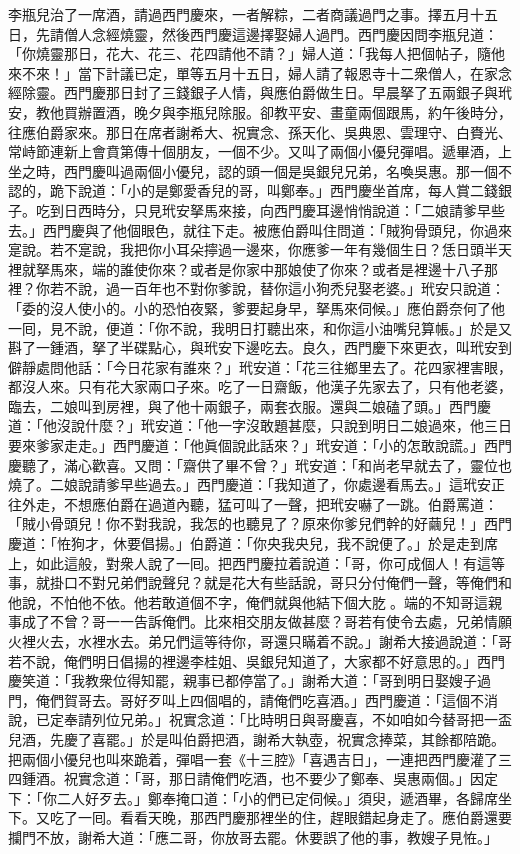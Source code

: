 李瓶兒治了一席酒，請過西門慶來，一者解粽，二者商議過門之事。擇五月十五日，先請僧人念經燒靈，然後西門慶這邊擇娶婦人過門。西門慶因問李瓶兒道：「你燒靈那日，花大、花三、花四請他不請？」{}婦人道：「我每人把個帖子，隨他來不來！」當下計議已定，單等五月十五日，婦人請了報恩寺十二衆僧人，在家念經除靈。西門慶那日封了三錢銀子人情，與應伯爵做生日。早晨拏了五兩銀子與玳安，教他買辦置酒，晚夕與李瓶兒除服。卻教平安、畫童兩個跟馬，約午後時分，往應伯爵家來。那日在席者謝希大、祝實念、孫天化、吳典恩、雲理守、白賚光、常峙節連新上會賁第傳十個朋友，一個不少。{}又叫了兩個小優兒彈唱。遞畢酒，上坐之時，西門慶叫過兩個小優兒，認的頭一個是吳銀兒兄弟，名喚吳惠。那一個不認的，{}跪下說道：「小的是鄭愛香兒的哥，叫鄭奉。」西門慶坐首席，每人賞二錢銀子。吃到日西時分，只見玳安拏馬來接，向西門慶耳邊悄悄說道：「二娘請爹早些去。」西門慶與了他個眼色，就往下走。{}被應伯爵叫住問道：「賊狗骨頭兒，你過來寔說。若不寔說，我把你小耳朵擰過一邊來，你應爹一年有幾個生日？恁日頭半天裡就拏馬來，端的誰使你來？或者是你家中那娘使了你來？或者是裡邊十八子那裡？你若不說，過一百年也不對你爹說，替你這小狗禿兒娶老婆。」玳安只說道：「委的沒人使小的。小的恐怕夜緊，爹要起身早，拏馬來伺候。」應伯爵奈何了他一囘，見不說，便道：「你不說，我明日打聽出來，和你這小油嘴兒算帳。」於是又斟了一鍾酒，拏了半碟點心，與玳安下邊吃去。良久，西門慶下來更衣，叫玳安到僻靜處問他話：「今日花家有誰來？」{}玳安道：「花三往鄉里去了。花四家裡害眼，都沒人來。只有花大家兩口子來。吃了一日齋飯，他漢子先家去了，只有他老婆，臨去，二娘叫到房裡，與了他十兩銀子，兩套衣服。還與二娘磕了頭。」西門慶道：「他沒說什麼？」玳安道：「他一字沒敢題甚麼，只說到明日二娘過來，他三日要來爹家走走。」西門慶道：「他眞個說此話來？」{}玳安道：「小的怎敢說謊。」西門慶聽了，滿心歡喜。又問：「齋供了畢不曾？」玳安道：「和尚老早就去了，靈位也燒了。二娘說請爹早些過去。」西門慶道：「我知道了，你處邊看馬去。」這玳安正往外走，不想應伯爵在過道內聽，猛可叫了一聲，把玳安嚇了一跳。伯爵罵道：「賊小骨頭兒！你不對我說，我怎的也聽見了？原來你爹兒們幹的好繭兒！」西門慶道：「恠狗才，休要倡揚。」伯爵道：「你央我央兒，我不說便了。」於是走到席上，如此這般，對衆人說了一囘。把西門慶拉着說道：「哥，你可成個人！有這等事，就掛口不對兄弟們說聲兒？就是花大有些話說，哥只分付俺們一聲，等俺們和他說，不怕他不依。他若敢道個不字，俺們就與他結下個大肐𦞂。端的不知哥這親事成了不曾？哥一一告訴俺們。比來相交朋友做甚麼？哥若有使令去處，兄弟情願火裡火去，水裡水去。弟兄們這等待你，哥還只瞞着不說。」{}謝希大接過說道：「哥若不說，俺們明日倡揚的裡邊李桂姐、吳銀兒知道了，大家都不好意思的。」西門慶笑道：「我教衆位得知罷，親事已都停當了。」謝希大道：「哥到明日娶嫂子過門，俺們賀哥去。哥好歹叫上四個唱的，請俺們吃喜酒。」西門慶道：「這個不消說，已定奉請列位兄弟。」祝實念道：「比時明日與哥慶喜，不如咱如今替哥把一盃兒酒，先慶了喜罷。」{}於是叫伯爵把酒，謝希大執壺，祝實念捧菜，其餘都陪跪。把兩個小優兒也叫來跪着，彈唱一套《十三腔》「喜遇吉日」，一連把西門慶灌了三四鍾酒。祝實念道：「哥，那日請俺們吃酒，也不要少了鄭奉、吳惠兩個。」因定下：「你二人好歹去。」鄭奉掩口道：「小的們已定伺候。」須臾，遞酒畢，各歸席坐下。又吃了一囘。看看天晚，那西門慶那裡坐的住，趕眼錯起身走了。應伯爵還要攔門不放，謝希大道：「應二哥，你放哥去罷。休要誤了他的事，教嫂子見恠。」


